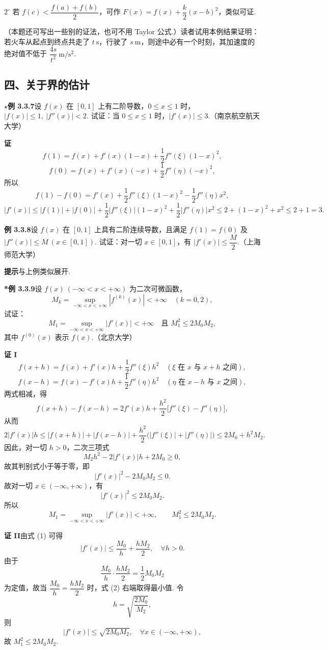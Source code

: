\documentclass[UTF8, 12pt, fontset=fandol, oneside]{ctexart}
\begin{document}
$2^\circ$ 若 $f(c)<\dfrac{f(a)+f(b)}2$，可作 $F(x)=f(x)+\dfrac{k}{2}(x-b)^2$，类似可证.

（本题还可写出一些别的证法，也可不用 Taylor 公式.）读者试用本例结果证明：若火车从起点到终点共走了 $t\ \mathrm s$，行驶了 $s\ \mathrm m$，则途中必有一个时刻，其加速度的绝对值不低于 $\dfrac{4s}{t^2}\ \mathrm{m/s^2}$.

\subsection*{四、关于界的估计}

\noindent\textbf{$\star$例 3.3.7}\quad 设 $f(x)$ 在 $[0,1]$ 上有二阶导数，$0\le x\le1$ 时，$|f(x)|\le1,\ |f''(x)|<2$. 试证：当 $0\le x\le1$ 时，$|f'(x)|\le3$.（南京航空航天大学）

\noindent\textbf{证}\quad
\[
  f(1)=f(x)+f'(x)(1-x)+\frac12f''(\xi)(1-x)^2,
\]
\[
  f(0)=f(x)+f'(x)(-x)+\frac12f''(\eta)(-x)^2,
\]
所以
\[
  f(1)-f(0)=f'(x)+\frac12f''(\xi)(1-x)^2-\frac12f''(\eta)x^2,
\]
\[
  |f'(x)|\le |f(1)|+|f(0)|+\frac12|f''(\xi)|(1-x)^2+\frac12|f''(\eta)|x^2
  \le2+(1-x)^2+x^2\le2+1=3.
\]

\noindent\textbf{例 3.3.8}\quad 设 $f(x)$ 在 $[0,1]$ 上具有二阶连续导数，且满足 $f(1)=f(0)$ 及 $|f''(x)|\le M\ (x\in[0,1])$. 试证：对一切 $x\in[0,1]$，有 $|f'(x)|\le\dfrac M2$.（上海师范大学）

\noindent\textbf{提示}\quad 与上例类似展开.

\noindent\textbf{*例 3.3.9}\quad 设 $f(x)\ (-\infty<x<+\infty)$ 为二次可微函数，
\[
  M_k=\sup_{-\infty<x<+\infty}|f^{(k)}(x)|<+\infty\quad(k=0,2),
\]
试证：
\[
  M_1=\sup_{-\infty<x<+\infty}|f'(x)|<+\infty\quad\text{且 }M_1^2\le2M_0M_2,
\]
其中 $f^{(0)}(x)$ 表示 $f(x)$.（北京大学）

\noindent\textbf{证 I}\quad
\[
  f(x+h)=f(x)+f'(x)h+\frac12f''(\xi)h^2\quad(\xi\text{ 在 }x\text{ 与 }x+h\text{ 之间}),
\]
\[
  f(x-h)=f(x)-f'(x)h+\frac12f''(\eta)h^2\quad(\eta\text{ 在 }x-h\text{ 与 }x\text{ 之间}),
\]
两式相减，得
\[
  f(x+h)-f(x-h)=2f'(x)h+\frac{h^2}{2}\bigl[f''(\xi)-f''(\eta)\bigr],
\]
从而
\[
  2|f'(x)|h\le |f(x+h)|+|f(x-h)|+\frac{h^2}{2}\bigl(|f''(\xi)|+|f''(\eta)|\bigr)
  \le 2M_0+h^2M_2. \tag{1}
\]
因此，对一切 $h>0$，二次三项式
\[
  M_2h^2-2|f'(x)|h+2M_0\ge0,
\]
故其判别式小于等于零，即
\[
  |f'(x)|^2-2M_0M_2\le0.
\]
故对一切 $x\in(-\infty,+\infty)$，有
\[
  |f'(x)|^2\le2M_0M_2.
\]
所以
\[
  M_1=\sup_{-\infty<x<+\infty}|f'(x)|<+\infty,\qquad M_1^2\le2M_0M_2.
\]

\noindent\textbf{证 II}\quad 由式 (1) 可得
\[
  |f'(x)|\le \frac{M_0}{h}+\frac{hM_2}{2},\quad \forall h>0. \tag{2}
\]
由于
\[
  \frac{M_0}{h}\cdot\frac{hM_2}{2}=\frac12M_0M_2
\]
为定值，故当 $\dfrac{M_0}{h}=\dfrac{hM_2}{2}$ 时，式 (2) 右端取得最小值. 令
\[
  h=\sqrt{\frac{2M_0}{M_2}},
\]
则
\[
  |f'(x)|\le\sqrt{2M_0M_2},\quad \forall x\in(-\infty,+\infty),
\]
故 $M_1^2\le2M_0M_2$.
\end{document}
